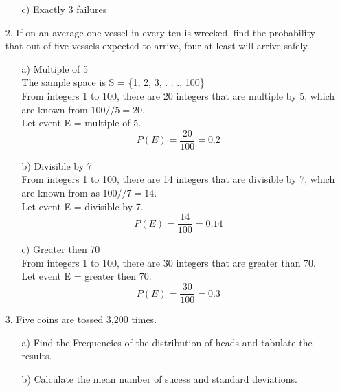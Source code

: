 \documentclass[a4paper,11pt,openright]{report}
\begin{document}
\begin{enumerate}
\begin{enumerate}
\item[c)] Exactly $3$ failures \\

\end{enumerate}

\item[2.] If on an average one vessel in every ten is wrecked, find the probability that out
of five vessels expected to arrive, four at least will arrive safely. 

\begin{enumerate}

\item[a)] Multiple of 5 \\
The sample space is S = \{1, 2, 3, . . ., 100\} \\
From integers 1 to 100, there are 20 integers that are multiple by 5, which are known from
$100//5 = 20$. \\
Let event E = multiple of 5. 
\begin{equation*}
P(E) = \frac{20}{100} = 0.2
\end{equation*}

\item[b)] Divisible by 7 \\
From integers 1 to 100, there are 14 integers that are divisible by 7, which are known from
as $100//7 = 14$. \\
Let event E = divisible by 7.
\begin{equation*}
P(E) = \frac{14}{100} = 0.14
\end{equation*}

\item[c)] Greater then 70 \\
From integers 1 to 100, there are 30 integers that are greater than 70. \\
Let event E = greater then 70. \\
\begin{equation*}
P(E) = \frac{30}{100} = 0.3
\end{equation*}

\end{enumerate}

\item[3.] Five coins are tossed 3,200 times.

\begin{enumerate}

\item[a)] Find the Frequencies of the distribution of heads and tabulate the results.
\item[b)] Calculate the mean number of sucess and standard deviations.

\end{enumerate}

\end{enumerate}
\end{document}
